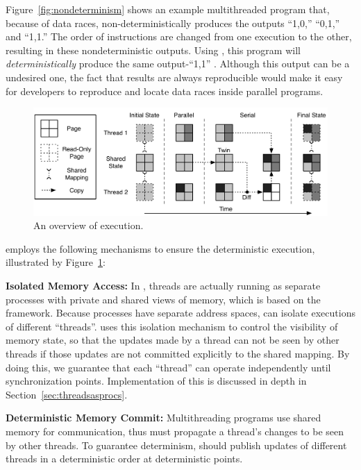 Figure~\ref{fig:nondeterminism} shows an example multithreaded program that, because of data races, non-deterministically produces the outputs ``1,0,'' ``0,1,'' and ``1,1.''  The order of instructions are changed from one execution to the other, resulting in these nondeterministic outputs. Using \dthreads{}, this program will \emph{deterministically} produce the same output-``1,1'' . Although this output can be a undesired one, the fact that results are always reproducible would make it easy for developers to reproduce and locate data races inside parallel programs.

\begin{figure}[h]
{\centering
\includegraphics[width=6in]{dthreads/figure/architecture-diagram}
\caption{An overview of \dthreads{} execution.\label{fig:architecture}}
}
\end{figure}

\dthreads{} employs the following mechanisms to ensure the deterministic execution, illustrated by Figure~\ref{fig:architecture}: 

\textbf{Isolated Memory Access:} In \dthreads{}, threads are actually running as separate processes with private and shared views of memory, which is based on the \sheriff{} framework. Because processes have separate address spaces, \dthreads{} can isolate executions of different ``threads''. \dthreads{} uses this isolation mechanism to control the visibility of memory state, so that the updates made by a thread can not be seen by other threads if those updates are not committed explicitly to the shared mapping. By doing this, we guarantee that each ``thread'' can operate independently until synchronization points. Implementation of this is discussed in depth in Section~\ref{sec:threadsasprocs}.

\textbf{Deterministic Memory Commit:} 
Multithreading programs use shared memory for communication, thus \dthreads{} must propagate a thread's changes to be seen by other threads. To guarantee determinism, \dthreads{} should publish updates of different threads in a deterministic order at deterministic points.

